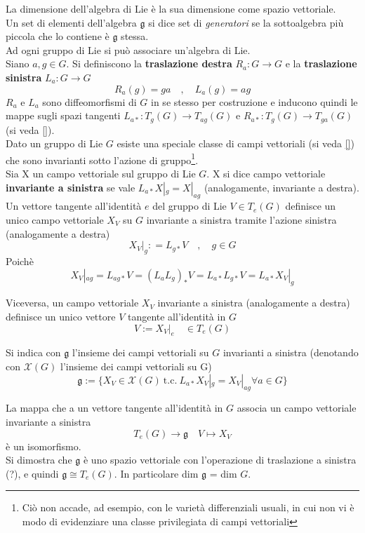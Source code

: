 La dimensione dell'algebra di Lie è la sua dimensione come spazio vettoriale.\\
Un set di elementi dell'algebra $\mathfrak{g}$ si dice set di \emph{generatori}
se la sottoalgebra più piccola che lo contiene è $\mathfrak{g}$ stessa.\\

Ad ogni gruppo di Lie si può associare un'algebra di Lie.\\

Siano $a,g \in G$. Si definiscono la \textbf{traslazione destra} $R_a : G \to G$
e la \textbf{traslazione sinistra} $L_a : G \to G$
$$
   R_a(g) = ga \quad,\quad L_a(g) = ag
$$
$R_a$ e $L_a$ sono diffeomorfismi di $G$ in se stesso per costruzione e inducono
quindi le mappe sugli spazi tangenti $L_{a*} : T_g(G) \to T_{ag}(G)$ e
$R_{a*} : T_g(G) \to T_{ga}(G)$ (si veda \ref{}).\\

Dato un gruppo di Lie $G$ esiste una speciale classe di campi vettoriali
(si veda \ref{}) che sono invarianti sotto l'azione di gruppo\footnote{
Ciò non accade, ad esempio, con le varietà differenziali usuali, in cui non vi è
modo di evidenziare una classe privilegiata di campi vettoriali
}.\\

Sia X un campo vettoriale sul gruppo di Lie $G$. X si dice campo vettoriale
\textbf{invariante a sinistra} se vale $L_{a*}X|_g = X|_{ag}$ (analogamente,
invariante a destra).\\

Un vettore tangente all'identità $e$ del gruppo di Lie $V \in T_e(G)$
definisce un unico campo vettoriale $X_V$ su $G$ invariante a sinistra tramite
l'azione sinistra (analogamente a destra)
$$
   X_V|_g : = L_{g*} V \quad , \quad g \in G
$$
Poichè
$$
   X_V|_{ag} = L_{ag*} V = (L_a L_g)_* V = L_{a*}L_{g*} V = L_{a*} X_V|_g
$$

Viceversa, un campo vettoriale $X_V$ invariante a sinistra (analogamente a destra)
definisce un unico vettore $V$ tangente all'identità in $G$
$$
   V := X_V|_e \quad \in T_e(G)
$$
\begin{definition}\label{def:GroupLieLlgebra}
  Si indica con $\mathfrak{g}$ l'insieme dei campi vettoriali su $G$ invarianti
  a sinistra (denotando con $\mathcal{X}(G)$ l'insieme dei campi vettoriali su G)
  $$
    \mathfrak{g} := \{ X_V \in \mathcal{X}(G) \mathrm{\: t.c. \:}
       L_{a*}X_V|_g = X_V|_{ag} \forall a \in G \}
  $$
\end{definition}
La mappa che a un vettore tangente all'identità in $G$ associa un campo vettoriale
invariante a sinistra
$$
   T_e(G) \to \mathfrak{g}  \quad V \mapsto X_V
$$
è un isomorfismo. \\
Si dimostra che $\mathfrak{g}$ è uno spazio vettoriale con l'operazione di
traslazione a sinistra (?), e quindi $\mathfrak{g} \cong T_e(G)$.
In particolare dim $\mathfrak{g}$ = dim $G$.\\

